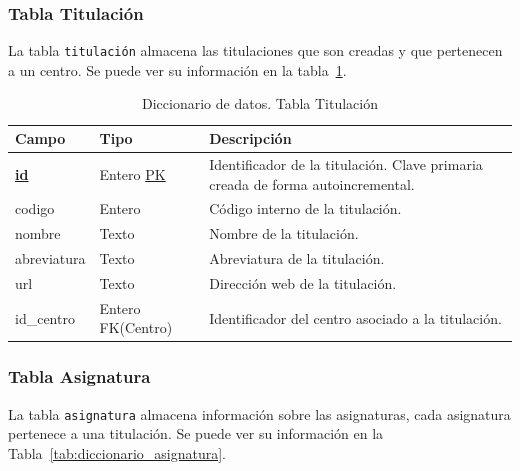 \subsubsection{Tabla Titulación}
La tabla \texttt{titulación} almacena las titulaciones que son creadas y que pertenecen a un centro.
Se puede ver su información en la tabla~\ref{tab:diccionario_titulacion}.
\begin{table}
  \centering 
  \begin{tabular}{l p{} p{}}
    \toprule
    \textbf{Campo} & \textbf{Tipo} & \textbf{Descripción}\\
    \midrule
    \textbf{\underline{id}} & Entero \underline{PK} & Identificador de la titulación. Clave primaria creada de forma autoincremental. \\ \addlinespace
    codigo & Entero & Código interno de la titulación. \\ \addlinespace
    nombre & Texto & Nombre de la titulación. \\ \addlinespace
    abreviatura & Texto & Abreviatura de la titulación. \\ \addlinespace
    url & Texto & Dirección web de la titulación. \\ \addlinespace
    id\_centro & Entero FK(Centro) & Identificador del centro asociado a la titulación. \\
    \bottomrule
  \end{tabular}
  \caption{Diccionario de datos. Tabla Titulación}
  \label{tab:diccionario_titulacion}
\end{table}

\subsubsection{Tabla Asignatura}
La tabla \texttt{asignatura} almacena información sobre las asignaturas, cada asignatura pertenece a una titulación. Se puede ver su información en la Tabla~\ref{tab:diccionario_asignatura}.

